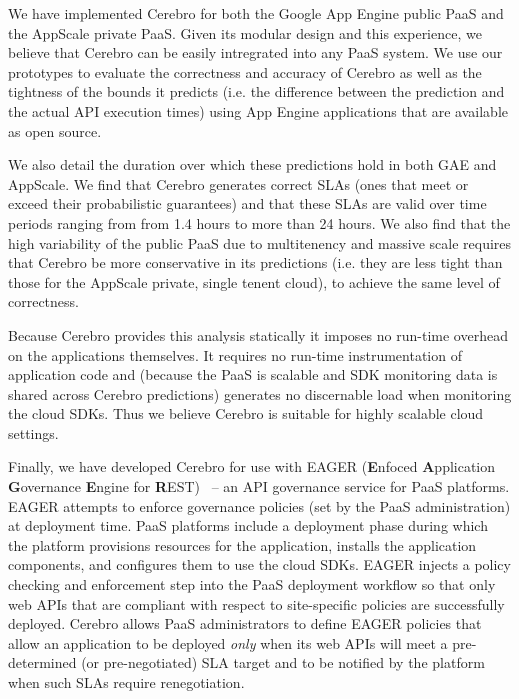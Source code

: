We have implemented Cerebro for both the Google App Engine public PaaS and 
the AppScale private PaaS. Given its modular design and this experience, 
we believe that Cerebro can be easily intregrated into any PaaS system.
We use our prototypes to evaluate the correctness and accuracy of Cerebro 
as well as the tightness
of the bounds it predicts (i.e. the difference between the prediction and 
the actual API execution times) using App Engine applications
that are available as open source.  

We also detail the duration over which 
these predictions hold in both GAE and AppScale.  
We find that Cerebro generates correct SLAs (ones that meet or exceed their
probabilistic guarantees) and that these SLAs are valid over time periods ranging from
from 1.4 hours to more than 24 hours.  
We also find that the high variability of the public PaaS due to multitenency
and massive scale requires that Cerebro be more conservative in its predictions
(i.e. they are less tight than those for the AppScale private, single tenent cloud), 
to achieve the same level of correctness.  

Because Cerebro provides this 
analysis statically it imposes no run-time overhead on the applications
themselves.  It requires no run-time instrumentation of application code and
(because the PaaS is scalable and SDK monitoring data is shared across Cerebro
predictions) generates no discernable load when monitoring
the cloud SDKs.  Thus we believe Cerebro is suitable for highly scalable cloud
settings.

Finally, we have developed Cerebro for use with EAGER (\textbf{E}nfoced
\textbf{A}pplication \textbf{G}overnance \textbf{E}ngine for
\textbf{R}EST)~\cite{eager-fop15} --
an API governance service for PaaS platforms.  EAGER attempts to enforce
governance policies (set by the PaaS administration) at deployment time.  PaaS
platforms include a deployment phase during which the platform provisions
resources for the application, installs the application components, and
configures them to use the cloud SDKs.  EAGER injects a policy checking and
enforcement step into the PaaS deployment workflow so that only web APIs that
are compliant with respect to site-specific policies are successfully deployed. 
Cerebro allows
PaaS administrators to define
EAGER policies that allow an application to be deployed \textit{only} when its
web APIs will meet a pre-determined (or pre-negotiated) SLA target and to be
notified by the platform when such SLAs require renegotiation.

